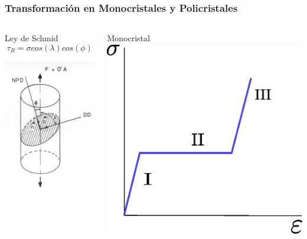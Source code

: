 \documentclass[usenames,dvipsnames]{beamer}
\begin{document}
\begin{frame}
\frametitle{Transformación en Monocristales y Policristales}

\begin{columns}

\begin{block}{Ley de Schmid}
\begin{equation*}
 \tau_{R}= \sigma cos(\lambda)cos(\phi)
\end{equation*}

\begin{center}
\includegraphics[width=0.5\columnwidth]{img/intro/tension.png}
\end{center}

\end{block}


\begin{block}{Monocristal}
\includegraphics[height=0.35\textheight]{img/intro/SigmavsDef.eps} 
\end{block}


\end{columns}
\end{frame}
\end{document}
